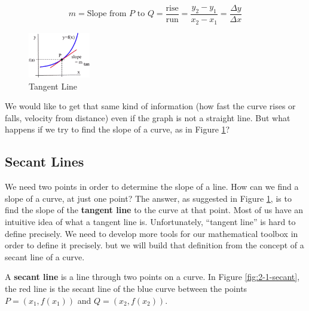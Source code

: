 $$m = \mbox{Slope from } P \mbox{ to } Q = \frac{\mbox{rise}}{\mbox{run}} = \frac{y_2-y_1}{x_2-x_1} = \frac{\Delta y}{\Delta x}$$


\begin{figure}
  \vspace{-10pt}
  \centering
    \includegraphics[width=0.24\textwidth]{img/chap2/image002.png}
\caption{Tangent Line}
\label{fig:2-1-slopeCurve}
\vspace{-10pt}
\end{figure}

We would like to get that same kind of information (how fast the curve rises or falls, velocity from distance) even if the graph is not a straight line. But what happens if we try to find the slope of a curve, as in Figure \ref{fig:2-1-slopeCurve}?

\subsection{Secant Lines}



We need two points in order to determine the slope of a line. How can we find a slope of a curve, at just one point? The answer, as suggested in Figure \ref{fig:2-1-slopeCurve}, is to find the slope of the {\bf tangent line} to the curve at that point. Most of us have an intuitive idea of what a tangent line is. Unfortunately, ``tangent line'' is hard to define precisely. We need to develop more tools for our mathematical toolbox in order to define it precisely. but we will build that definition from the concept of a secant line of a curve.

\begin{definition}
A {\bf secant line} is a line through two points on a curve. In Figure \ref{fig:2-1-secant}, the red line is the secant line of the blue curve between the points $P = (x_1, f(x_1))$ and $Q = (x_2, f(x_2))$.
\end{definition}

